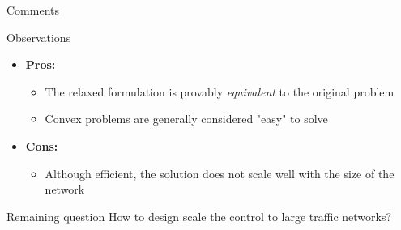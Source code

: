 \begin{frame}{Comments}
    \begin{exampleblock}{Observations}
    \begin{itemize}
    \item \textbf{Pros:}
    \begin{itemize}
    \item The relaxed formulation is provably \emph{equivalent} to the original problem
    \item Convex problems are generally considered "easy" to solve
    \end{itemize}
    \item \textbf{Cons:}
    \begin{itemize}
    \item Although efficient, the solution does not scale well with the size of the network
    \end{itemize}
    \end{itemize}
    \end{exampleblock}
    \begin{block}{Remaining question}
        How to design scale the control to large traffic networks?
    \end{block}        
\end{frame}
